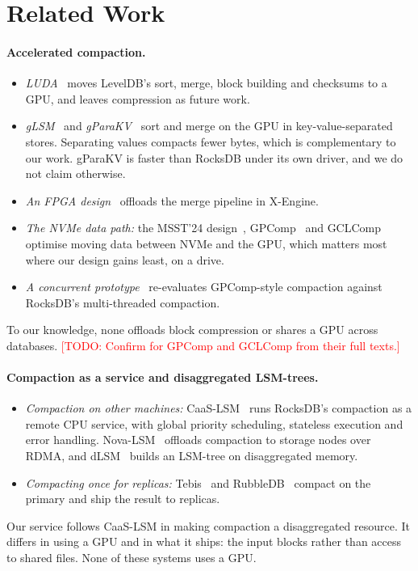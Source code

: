 \documentclass[sigconf, nonacm]{acmart}
\newcommand{\todo}[1]{\textcolor{red}{[TODO: #1]}}
\begin{document}
\section{Related Work}
\label{sec:related}
\paragraph{Accelerated compaction.}
\begin{itemize}
  \item \emph{LUDA}~\cite{luda2020} moves LevelDB's sort, merge, block building and checksums
        to a GPU, and leaves compression as future work.
  \item \emph{gLSM}~\cite{glsm2024} and \emph{gParaKV}~\cite{gparakv2025} sort and merge on the
        GPU in key-value-separated stores. Separating values compacts fewer bytes, which is
        complementary to our work. gParaKV is faster than RocksDB under its own driver, and
        we do not claim otherwise.
  \item \emph{An FPGA design}~\cite{fpga2020} offloads the merge pipeline in X-Engine.
  \item \emph{The NVMe data path:} the MSST'24 design~\cite{zhou2024msst},
        GPComp~\cite{gpcomp2025} and GCLComp~\cite{gclcomp2025} optimise moving data between
        NVMe and the GPU, which matters most where our design gains least, on a drive.
  \item \emph{A concurrent prototype}~\cite{reevalgpcomp} re-evaluates GPComp-style
        compaction against RocksDB's multi-threaded compaction.
\end{itemize}
To our knowledge, none offloads block compression or shares a GPU across databases.
\todo{Confirm for GPComp and GCLComp from their full texts.}

\paragraph{Compaction as a service and disaggregated LSM-trees.}
\begin{itemize}
  \item \emph{Compaction on other machines:} CaaS-LSM~\cite{caaslsm2024} runs RocksDB's
        compaction as a remote CPU service, with global priority scheduling, stateless
        execution and error handling. Nova-LSM~\cite{novalsm2021} offloads compaction to
        storage nodes over RDMA, and dLSM~\cite{dlsm2023} builds an LSM-tree on disaggregated
        memory.
  \item \emph{Compacting once for replicas:} Tebis~\cite{tebis2022} and
        RubbleDB~\cite{rubbledb2023} compact on the primary and ship the result to replicas.
\end{itemize}
Our service follows CaaS-LSM in making compaction a disaggregated resource. It differs in
using a GPU and in what it ships: the input blocks rather than access to shared files. None of
these systems uses a GPU.
\end{document}

